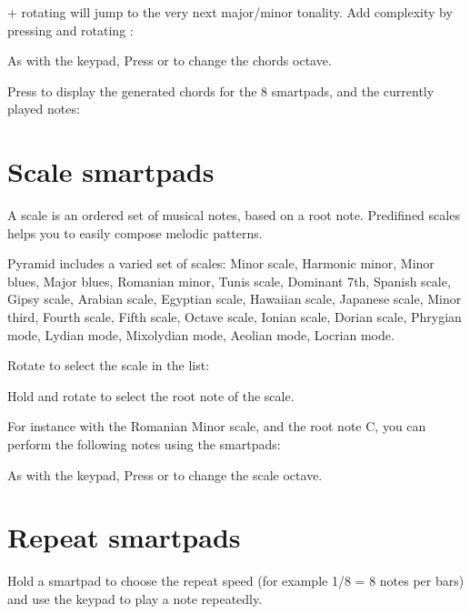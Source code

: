 + rotating \encodericon{} will jump to the very next major/minor tonality. Add complexity by pressing and rotating \encodericon{}:


As with the keypad, Press \btn{<} or \btn{>} to change the chords octave.



Press  to display the generated chords for the 8 smartpads, and the currently played notes:



\section{Scale smartpads}

A scale is an ordered set of musical notes, based on a root note. Predifined scales helps you to easily compose melodic patterns.

Pyramid includes a varied set of scales: Minor scale, Harmonic minor, Minor blues, Major blues, Romanian minor, Tunis scale, Dominant 7th, Spanish scale, Gipsy scale, Arabian scale, Egyptian scale, Hawaiian scale, Japanese scale, Minor third, Fourth scale, Fifth scale, Octave scale, Ionian scale, Dorian scale, Phrygian mode, Lydian mode, Mixolydian mode, Aeolian mode, Locrian mode.

Rotate \encodericon{} to select the scale in the list:


Hold  and rotate \encodericon{} to select the root note of the scale.

For instance with the Romanian Minor scale, and the root note C, you can perform the following notes using the smartpads:


As with the keypad, Press \btn{<} or \btn{>} to change the scale octave.


\section{Repeat smartpads}

Hold a smartpad \smartpadsicon{} to choose the repeat speed (for example 1/8 = 8 notes per bars) and use the keypad \keypadicon{} to play a note repeatedly.

